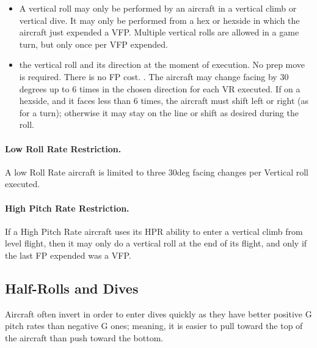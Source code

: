 \begin{itemize}

    \item{} A vertical roll may only be performed by an aircraft in a vertical climb or vertical dive. It may only be performed from a hex or hexside in which the aircraft just expended a VFP. Multiple vertical rolls are allowed in a game turn, but only once per VFP expended.

    \item{}  the vertical roll and its direction at the moment of execution. No prep move is required. There is no FP cost. . The aircraft may change facing  by 30 degrees up to 6 times in the chosen direction for each VR executed. If on a hexside, and it faces less than 6 times, the aircraft must shift left or right (as for a turn); otherwise it may stay on the line or shift as desired during the roll.  

\end{itemize}

\paragraph{Low Roll Rate Restriction.} A low Roll Rate aircraft is limited to three 30{deg} facing changes per Vertical roll executed.

\paragraph{High Pitch Rate Restriction.} If a High Pitch Rate aircraft uses its HPR ability to enter a vertical climb from level flight, then it may only do a vertical roll at the end of its flight, and only if the last FP expended was a VFP.

\subsection{Half-Rolls and Dives}
\label{rule:half-rolls-and-dives}

Aircraft often invert in order to enter dives quickly as they have better positive G pitch rates than negative G ones; meaning, it is easier to pull toward the top of the aircraft than push toward the bottom. 


